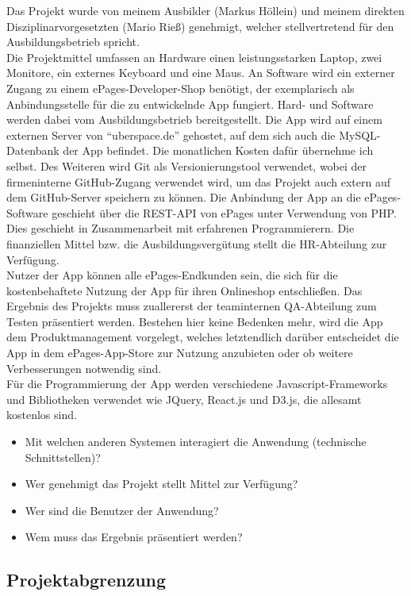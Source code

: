 Das Projekt wurde von meinem Ausbilder (Markus Höllein) und meinem direkten Disziplinarvorgesetzten (Mario Rieß) genehmigt, welcher stellvertretend für den Ausbildungsbetrieb spricht. \\
 Die Projektmittel umfassen an Hardware einen leistungsstarken Laptop, zwei Monitore, ein externes Keyboard und eine Maus. An Software wird ein externer Zugang zu einem ePages-Developer-Shop benötigt, der exemplarisch als Anbindungsstelle für die zu entwickelnde App fungiert. Hard- und Software werden dabei vom Ausbildungsbetrieb bereitgestellt. Die App wird auf einem externen Server von ``uberspace.de'' gehostet, auf dem sich auch die MySQL-Datenbank der App befindet. Die monatlichen Kosten dafür übernehme ich selbst. Des Weiteren wird Git als Versionierungstool verwendet, wobei der firmeninterne GitHub-Zugang verwendet wird, um das Projekt auch extern auf dem GitHub-Server speichern zu können. Die Anbindung der App an die ePages-Software geschieht über die REST-API von ePages unter Verwendung von PHP. Dies geschieht in Zusammenarbeit mit erfahrenen Programmierern. Die finanziellen Mittel bzw. die Ausbildungsvergütung stellt die HR-Abteilung zur Verfügung.\\
Nutzer der App können alle ePages-Endkunden sein, die sich für die kostenbehaftete Nutzung der App für ihren Onlineshop entschließen. Das Ergebnis des Projekts muss zuallererst der teaminternen QA-Abteilung zum Testen präsentiert werden. Bestehen hier keine Bedenken mehr, wird die App dem Produktmanagement vorgelegt, welches letztendlich darüber entscheidet die App in dem ePages-App-Store zur Nutzung anzubieten oder ob weitere Verbesserungen notwendig sind.\\
Für die Programmierung der App werden verschiedene Javascript-Frameworks und Bibliotheken verwendet wie JQuery, React.js und D3.js, die allesamt kostenlos sind.

\begin{itemize}
	\item Mit welchen anderen Systemen interagiert die Anwendung (technische Schnittstellen)?
	\item Wer genehmigt das Projekt \bzw stellt Mittel zur Verfügung? 
	\item Wer sind die Benutzer der Anwendung?
	\item Wem muss das Ergebnis präsentiert werden?
\end{itemize}


\subsection{Projektabgrenzung} 
\label{sec:Projektabgrenzung}

